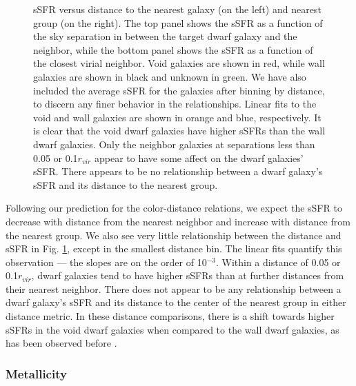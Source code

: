 \begin{figure}
    \caption[sSFR versus distance to nearest neighbor and group]{sSFR versus 
    distance to the nearest galaxy (on the left) and nearest group (on the 
    right).  The top panel shows the sSFR as a function of the sky separation in 
    \hMpc between the target dwarf galaxy and the neighbor, while the bottom 
    panel shows the sSFR as a function of the closest virial neighbor.  Void 
    galaxies are shown in red, while wall galaxies are shown in black and 
    unknown in green.  We have also included the average sSFR for the galaxies 
    after binning by distance, to discern any finer behavior in the 
    relationships.  Linear fits to the void and wall galaxies are shown in 
    orange and blue, respectively.  It is clear that the void dwarf galaxies 
    have higher sSFRs than the wall dwarf galaxies.  Only the neighbor galaxies 
    at separations less than 0.05 \hMpc or 0.1$r_{vir}$ appear to have some 
    affect on the dwarf galaxies' sSFR.  There appears to be no relationship 
    between a dwarf galaxy's sSFR and its distance to the nearest group.}
    \label{fig:sSFR}
\end{figure}

Following our prediction for the color-distance relations, we expect the 
sSFR to decrease with distance from the nearest neighbor and increase with 
distance from the nearest group.  We also see very little relationship between 
the distance and sSFR in Fig. \ref{fig:sSFR}, except in the smallest distance 
bin.  The linear fits quantify this observation --- the slopes are on the order 
of 10$^{-3}$.  Within a distance of 0.05 \hMpc or 0.1$r_{vir}$, dwarf galaxies 
tend to have higher sSFRs than at further distances from their nearest neighbor.  
There does not appear to be any relationship between a dwarf galaxy's sSFR and 
its distance to the center of the nearest group in either distance metric.  In 
these distance comparisons, there is a shift towards higher sSFRs in the void 
dwarf galaxies when compared to the wall dwarf galaxies, as has been observed 
before \citep{Rojas05,vonBendaBeckmann08,Moorman15,Beygu16}.  


\subsubsection{Metallicity}

